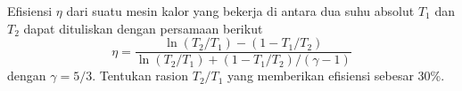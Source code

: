 \begin{soal}
Efisiensi $\eta$ dari suatu mesin kalor
yang bekerja di antara dua suhu absolut $T_1$
dan $T_2$ dapat dituliskan dengan persamaan berikut
\begin{equation*}
\eta = \frac{\ln(T_2/T_1) - (1 - T_1/T_2)}{\ln(T_2/T_1) + (1 - T_1/T_2)/(\gamma - 1)}
\end{equation*}
dengan $\gamma = 5/3$. Tentukan rasion $T_2/T_1$ yang memberikan
efisiensi sebesar 30\%.
\end{soal}


